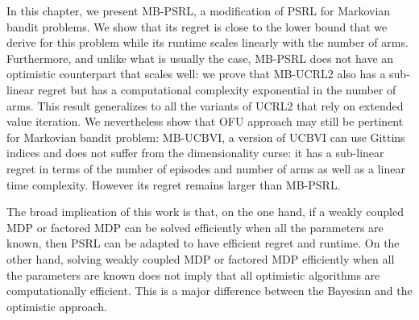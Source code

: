In this chapter, we present MB-PSRL, a modification of PSRL for Markovian bandit problems. We show that its regret is close to the lower bound that we derive for this problem while its runtime scales linearly with the number of arms. Furthermore, and unlike what is usually the case, MB-PSRL does not have an optimistic counterpart that scales well: we prove that  MB-UCRL2 also has a sub-linear regret but has a computational complexity exponential in the number of arms. This result generalizes to all  the variants of UCRL2 that rely on extended value iteration. We nevertheless show that OFU approach may still be pertinent for Markovian bandit problem:  MB-UCBVI, a version of UCBVI can use Gittins indices and  does not suffer from the dimensionality curse: it has a sub-linear regret in terms of the number of episodes and number of arms as well as a linear time complexity. However its regret remains larger than MB-PSRL.

The broad implication of this work is that, on the one hand, if a weakly coupled MDP or factored MDP can be solved efficiently when all the parameters are known, then PSRL can be adapted to have efficient regret and runtime. On the other hand, solving weakly coupled MDP or factored MDP efficiently when all the parameters are known does not imply that all optimistic algorithms are computationally efficient. This is a major difference between the Bayesian and the optimistic approach.

\newpage

